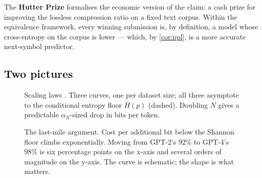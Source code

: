 \documentclass[12pt,a4paper]{article}
\theoremstyle{plain}
\theoremstyle{definition}
\begin{document}
The \textbf{Hutter Prize} \citep{hutter2005universal} formalises
the economic version of the claim: a cash prize for improving the
lossless compression ratio on a fixed text corpus.  Within the
equivalence framework, every winning submission is, by definition,
a model whose cross-entropy on the corpus is lower --- which, by
\cref{cor:ppl}, is a more accurate next-symbol predictor.

\subsection*{Two pictures}

\begin{figure}[h]
\centering
{}
\caption{Scaling laws \citep{kaplan2020scaling}.  Three curves, one
per dataset size; all three asymptote to the conditional entropy
floor $\overline{H}(p)$ (dashed).  Doubling $N$ gives a predictable
$\alpha_N$-sized drop in bits per token.}
\label{fig:scaling}
\end{figure}

\begin{figure}[h]
\centering
{}
\caption{The last-mile argument.  Cost per additional bit below the
Shannon floor climbs exponentially.  Moving from GPT-2's $92\%$ to
GPT-4's $98\%$ is six percentage points on the x-axis and several
orders of magnitude on the y-axis.  The curve is schematic; the
shape is what matters.}
\label{fig:lastmile}
\end{figure}
\end{document}
